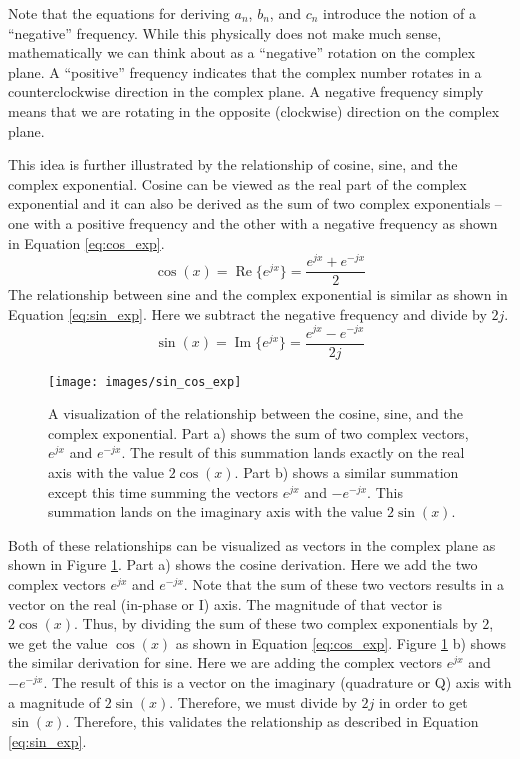 Note that the equations for deriving $a_n$, $b_n$, and $c_n$ introduce the notion of a ``negative'' frequency. While this physically does not make much sense, mathematically we can think about as a ``negative'' rotation on the complex plane. A ``positive'' frequency indicates that the complex number rotates in a counterclockwise direction in the complex plane. A negative frequency simply means that we are rotating in the opposite (clockwise) direction on the complex plane. 



This idea is further illustrated by the relationship of cosine, sine, and the complex exponential.  Cosine can be viewed as the real part of the complex exponential and it can also be derived as the sum of two complex exponentials -- one with a positive frequency and the other with a negative frequency as shown in Equation \ref{eq:cos_exp}.
\begin{equation}
\cos(x) = \operatorname{Re} \{ e^{jx} \} = \frac{e^{jx} + e^{-jx}}{2}
\label{eq:cos_exp}
\end{equation} 
The relationship between sine and the complex exponential is similar as shown in Equation \ref{eq:sin_exp}. Here we subtract the negative frequency and divide by $2j$.
\begin{equation}
\sin(x) = \operatorname{Im} \{ e^{jx} \} = \frac{e^{jx} - e^{-jx}}{2j} 
\label{eq:sin_exp}
\end{equation}

\begin{figure}
\centering
\texttt{[image: images/sin\_cos\_exp]}
\caption{A visualization of the relationship between the cosine, sine, and the complex exponential. Part a) shows the sum of two complex vectors, $e^{jx}$ and $e^{-jx}$. The result of this summation lands exactly on the real axis with the value $2 \cos (x)$. Part b) shows a similar summation except this time summing the vectors $e^{jx}$ and $-e^{-jx}$. This summation lands on the imaginary axis with the value $2 \sin (x)$.}
\label{fig:sin_cos_exp}
\end{figure}


Both of these relationships can be visualized as vectors in the complex plane as shown in Figure \ref{fig:sin_cos_exp}. Part a) shows the cosine derivation. Here we add the two complex vectors $e^{jx}$ and $e^{-jx}$. Note that the sum of these two vectors results in a vector on the real (in-phase or I) axis. The magnitude of that vector is $2 \cos(x)$. Thus, by dividing the sum of these two complex exponentials by $2$, we get the value $\cos (x)$ as shown in Equation \ref{eq:cos_exp}.  Figure \ref{fig:sin_cos_exp} b) shows the similar derivation for sine. Here we are adding the complex vectors $e^{jx}$ and $-e^{-jx}$. The result of this is a vector on the imaginary (quadrature or Q) axis with a magnitude of $2 \sin (x)$. Therefore, we must divide by $2j$ in order to get $\sin (x)$. Therefore, this validates the relationship as described in Equation \ref{eq:sin_exp}.


